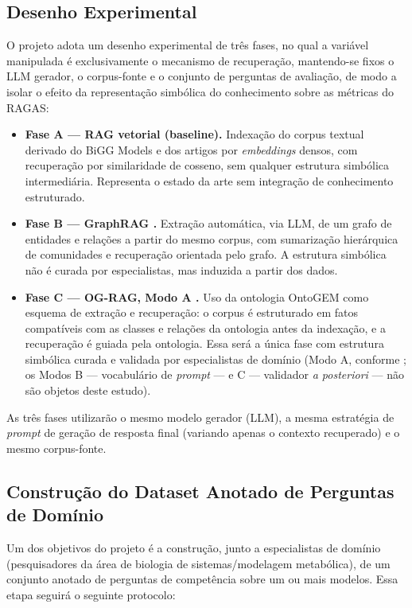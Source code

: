 \documentclass{article}
\begin{document}
\subsection{Desenho Experimental}

O projeto adota um desenho experimental de três fases, no qual a variável manipulada é exclusivamente o mecanismo de recuperação, mantendo-se fixos o LLM gerador, o corpus-fonte e o conjunto de perguntas de avaliação, de modo a isolar o efeito da representação simbólica do conhecimento sobre as métricas do RAGAS:

\begin{itemize}
	\item \textbf{Fase A --- RAG vetorial (baseline).} Indexação do corpus textual derivado do BiGG Models e dos artigos por \textit{embeddings} densos, com recuperação por similaridade de cosseno, sem qualquer estrutura simbólica intermediária. Representa o estado da arte sem integração de conhecimento estruturado.
	\item \textbf{Fase B --- GraphRAG \cite{edge2024graphrag}.} Extração automática, via LLM, de um grafo de entidades e relações a partir do mesmo corpus, com sumarização hierárquica de comunidades e recuperação orientada pelo grafo. A estrutura simbólica não é curada por especialistas, mas induzida a partir dos dados.
	\item \textbf{Fase C --- OG-RAG, Modo A \cite{sharma2025ograg}.} Uso da ontologia OntoGEM \cite{souza2025ontogem} como esquema de extração e recuperação: o corpus é estruturado em fatos compatíveis com as classes e relações da ontologia antes da indexação, e a recuperação é guiada pela ontologia. Essa será a única fase com estrutura simbólica curada e validada por especialistas de domínio (Modo A, conforme \cite{sharma2025ograg}; os Modos B --- vocabulário de \textit{prompt} --- e C --- validador \textit{a posteriori} --- não são objetos deste estudo).
\end{itemize}

As três fases utilizarão o mesmo modelo gerador (LLM), a mesma estratégia de \textit{prompt} de geração de resposta final (variando apenas o contexto recuperado) e o mesmo corpus-fonte.

\subsection{Construção do Dataset Anotado de Perguntas de Domínio}

Um dos objetivos do projeto é a construção, junto a especialistas de domínio (pesquisadores da área de biologia de sistemas/modelagem metabólica), de um conjunto anotado de perguntas de competência sobre um ou mais modelos. Essa etapa seguirá o seguinte protocolo:
\end{document}
